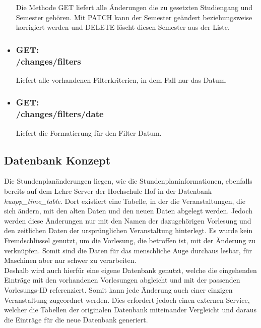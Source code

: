 \begin{itemize}
Die Methode GET liefert alle Änderungen die zu gesetzten Studiengang und Semester gehören. Mit PATCH kann der Semester geändert beziehungsweise korrigiert werden und DELETE löscht diesen Semester aus der Liste.
\item \subsubsection{GET:\\ /changes/filters} 
Liefert alle vorhandenen Filterkriterien, in dem Fall nur das Datum.
\item \subsubsection{GET:\\ /changes/filters/date} 
Liefert die Formatierung für den Filter Datum.
\end{itemize}

\subsection*{Datenbank Konzept}
\label{sec:stundenplan_change_db}

Die Stundenplanänderungen liegen, wie die Stundenplaninformationen, ebenfalls bereits auf dem Lehre Server der Hochschule Hof in der Datenbank \textit{huapp_time_\-table}. Dort existiert eine Tabelle, in der die Veranstaltungen, die sich ändern, mit den alten Daten und den neuen Daten abgelegt werden. Jedoch werden diese Änderungen nur mit den Namen der dazugehörigen Vorlesung und den zeitlichen Daten der ursprünglichen Veranstaltung hinterlegt. Es wurde kein Fremdschlüssel genutzt, um die Vorlesung, die betroffen ist, mit der Änderung zu verknüpfen. Somit sind die Daten für das menschliche Auge durchaus lesbar, für Maschinen aber nur schwer zu verarbeiten.
\\
\linebreak
Deshalb wird auch hierfür eine eigene Datenbank genutzt, welche die eingehenden Einträge mit den vorhandenen Vorlesungen abgleicht und mit der passenden Vorlesungs-ID referenziert. Somit kann jede Änderung auch einer einzigen Veranstaltung zugeordnet werden. Dies erfordert jedoch einen externen Service, welcher die Tabellen der originalen Datenbank miteinander Vergleicht und daraus die Einträge für die neue Datenbank generiert. 

